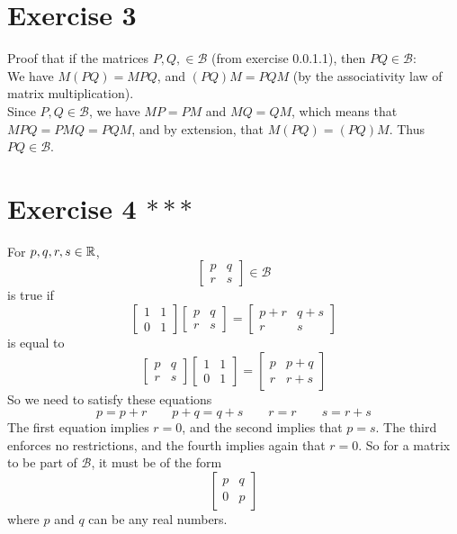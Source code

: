 \documentclass[12pt]{article}
\begin{document}
    \section*{Exercise 3}
    Proof that if the matrices $P, Q, \in \mathcal{B}$
    (from exercise 0.0.1.1),
    then $PQ \in \mathcal{B}$: \\
    We have $M(PQ) = MPQ$, and $(PQ)M = PQM$
    (by the associativity law of matrix multiplication). \\
    Since $P, Q \in \mathcal{B}$,
    we have $MP = PM$ and $MQ = QM$,
    which means that $MPQ = PMQ = PQM$,
    and by extension, that $M(PQ) = (PQ)M$.
    Thus $PQ \in \mathcal{B}$. \\ 

    \section*{Exercise 4 $***$}
    For $p, q, r, s \in \mathbb{R}$,
    \[ \begin{bmatrix}
        p & q \\
        r & s
    \end{bmatrix} \in \mathcal{B} \]
    is true if 
    \[  \begin{bmatrix}
        1 & 1 \\
        0 & 1
    \end{bmatrix}
    \begin{bmatrix}
        p & q \\
        r & s
    \end{bmatrix} 
    = \begin{bmatrix}
        p + r & q + s \\
        r & s
    \end{bmatrix} \]
    is equal to
    \[
        \begin{bmatrix}
        p & q \\
        r & s
    \end{bmatrix}
    \begin{bmatrix}
        1 & 1 \\
        0 & 1
    \end{bmatrix}
    =  \begin{bmatrix}
        p & p + q \\
        r & r + s
    \end{bmatrix} \]
    So we need to satisfy these equations
    \[ p = p + r \qquad p + q = q + s 
    \qquad r = r \qquad s = r + s \]
    The first equation implies $r = 0$,
    and the second implies that $p = s$.
    The third enforces no restrictions,
    and the fourth implies again that $r = 0$.
    So for a matrix to be part of $\mathcal{B}$,
    it must be of the form
    \[ \begin{bmatrix}
        p & q \\
        0 & p
    \end{bmatrix} \]
    where $p$ and $q$ can be any real numbers. \\
\end{document}
